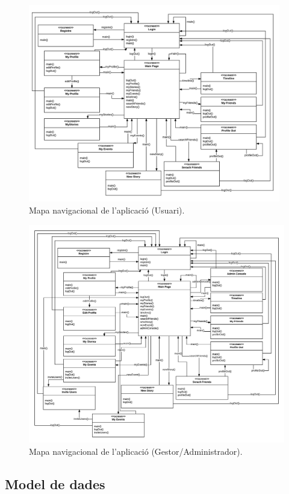 \documentclass[11pt,catalan,listoffigures,listoftables]{tfgetsinf}
\begin{document}
\begin{figure}[h]
\includegraphics[width=11cm]{images/image9}
\centering
\caption[Figura 4.4]{Mapa navigacional de l'aplicació (Usuari).}
\centering
\end{figure}
\newpage
\begin{figure}[H]
\includegraphics[width=15cm]{images/image10}
\centering
\caption[Figura 4.5]{Mapa navigacional de l'aplicació (Gestor/Administrador).}
\centering
\end{figure}

\subsection{Model de dades}
\end{document}
